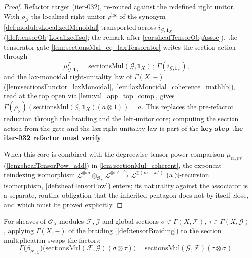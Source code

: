 \begin{proof}
  Refactor target (iter-032), re-routed against the redefined right unitor. With
  \(\rho_{\mathcal{G}}\) the localized right unitor \(\rho^{\mathrm{loc}}\) of the
  synonym \cref{def:modulesLocalizedMonoidal} transported across
  \(i_{\mathcal{G},\mathbf{1}_X}\) (\cref{def:tensorObjLocalizedIso}; the remark
  after \cref{cor:sheafTensorObjAssoc}), the tensorator gate
  \cref{lem:sectionsMul_eq_laxTensorator} writes the section action through
  \[
    \mu^{\Gamma}_{\mathcal{G},\mathbf{1}_X}
      = \mathrm{sectionsMul}(\mathcal{G},\mathbf{1}_X) \,;\,
        \Gamma(i_{\mathcal{G},\mathbf{1}_X}),
  \]
  and the lax-monoidal right-unitality law of \(\Gamma(X,-)\)
  (\cref{lem:sectionsFunctor_laxMonoidal}, \cref{lem:laxMonoidal_coherence_mathlib}),
  read at the top open via \cref{lem:val_app_top_comp}, gives
  \(\Gamma(\rho_{\mathcal{G}})(\mathrm{sectionsMul}(\mathcal{G},\mathbf{1}_X)
  (a \otimes 1)) = a\). This replaces the pre-refactor reduction through the
  braiding and the left-unitor core; computing the section action from the gate and
  the lax right-unitality law is part of the \textbf{key step the iter-032 refactor
  must verify}.

  When this core is combined with the degreewise tensor-power comparison
  \(\mu_{m,m'}\) (\cref{lem:sheafTensorPow_add}) in \cref{lem:sectionMul_coherent},
  the exponent-reindexing isomorphism \(\mathcal{L}^{\otimes m} \otimes_{\mathcal{O}_X}
  \mathcal{L}^{\otimes m'} \xrightarrow{\ \sim\ } \mathcal{L}^{\otimes (m+m')}\)
  (a \(\mathbb{N}\)-recursion isomorphism, \cref{def:sheafTensorPow}) enters; its
  naturality against the associator is a separate, routine obligation that the
  inherited pentagon does not by itself close, and which must be proved explicitly.
\end{proof}

\begin{lemma}
  \label{lem:sectionMul_braiding_core}
  For sheaves of \(\mathcal{O}_X\)-modules \(\mathcal{F}, \mathcal{G}\) and global
  sections \(\sigma \in \Gamma(X,\mathcal{F})\),
  \(\tau \in \Gamma(X,\mathcal{G})\), applying \(\Gamma(X,-)\) of the braiding
  (\cref{def:tensorBraiding}) to the section multiplication swaps the factors:
  \[
    \Gamma\bigl(\beta_{\mathcal{F},\mathcal{G}}\bigr)
      \bigl( \mathrm{sectionsMul}(\mathcal{F},\mathcal{G})(\sigma \otimes \tau)\bigr)
      = \mathrm{sectionsMul}(\mathcal{G},\mathcal{F})(\tau \otimes \sigma) .
  \]
\end{lemma}

